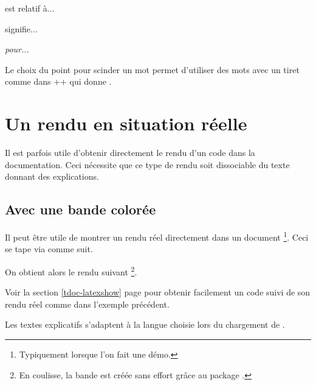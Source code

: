 \begin{tdoclatex}[sbs]
 est relatif à...

 signifie...

\emph{ pour...}
\end{tdoclatex}


\begin{tdocrem}
    Le choix du point pour scinder un mot permet d'utiliser des mots avec un tiret comme dans \tdocinlatex++ qui donne .
\end{tdocrem}


\section{Un rendu en situation réelle} \label{tdoc-showcase}

Il est parfois utile d'obtenir directement le rendu d'un code dans la documentation. Ceci nécessite que ce type de rendu soit dissociable du texte donnant des explications.




\subsection{Avec une bande colorée}

\begin{tdocexa}
    Il peut être utile de montrer un rendu réel directement dans un document
    \footnote{
        Typiquement lorsque l'on fait une démo.
    }.
    Ceci se tape via  comme suit.


    On obtient alors le rendu suivant
    \footnote{
        En coulisse, la bande est créée sans effort grâce au package .
    }.

    \medskip

    
\end{tdocexa}


\begin{tdocrem}
    Voir la section \ref{tdoc-latexshow} page \pageref{tdoc-latexshow} pour obtenir facilement un code suivi de son rendu réel comme dans l'exemple précédent.
\end{tdocrem}


\begin{tdocnote}
    Les textes explicatifs s'adaptent à la langue choisie lors du chargement de .
\end{tdocnote}


